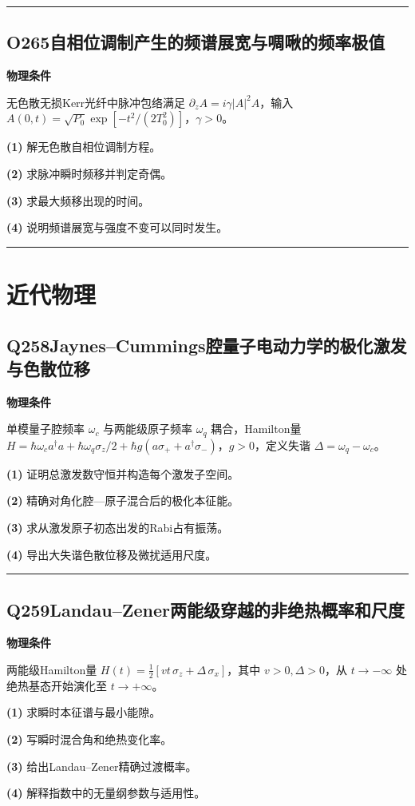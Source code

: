 \documentclass[UTF8,a4paper,11pt,oneside,openany]{ctexbook}
\begin{document}
\par\bigskip\hrule\bigskip
\section*{O265\quad 自相位调制产生的频谱展宽与啁啾的频率极值}
\textbf{物理条件}\par 无色散无损Kerr光纤中脉冲包络满足 \(\partial_zA=i\gamma|A|^2A\)，输入 \(A(0,t)=\sqrt{P_0}\exp[-t^2/(2T_0^2)]\)，\(\gamma>0\)。
\par\noindent\textbf{(1)} 解无色散自相位调制方程。
\par\noindent\textbf{(2)} 求脉冲瞬时频移并判定奇偶。
\par\noindent\textbf{(3)} 求最大频移出现的时间。
\par\noindent\textbf{(4)} 说明频谱展宽与强度不变可以同时发生。

\par\bigskip\hrule\bigskip
\chapter{近代物理}
\section*{Q258\quad Jaynes–Cummings腔量子电动力学的极化激发与色散位移}
\textbf{物理条件}\par 单模量子腔频率 \(\omega_c\) 与两能级原子频率 \(\omega_q\) 耦合，Hamilton量 \(H=\hbar\omega_c a^\dagger a+\hbar\omega_q\sigma_z/2+\hbar g(a\sigma_++a^\dagger\sigma_-)\)，\(g>0\)，定义失谐 \(\Delta=\omega_q-\omega_c\)。
\par\noindent\textbf{(1)} 证明总激发数守恒并构造每个激发子空间。
\par\noindent\textbf{(2)} 精确对角化腔—原子混合后的极化本征能。
\par\noindent\textbf{(3)} 求从激发原子初态出发的Rabi占有振荡。
\par\noindent\textbf{(4)} 导出大失谐色散位移及微扰适用尺度。

\par\bigskip\hrule\bigskip
\section*{Q259\quad Landau–Zener两能级穿越的非绝热概率和尺度}
\textbf{物理条件}\par 两能级Hamilton量 \(H(t)=\tfrac12[vt\,\sigma_z+\Delta\,\sigma_x]\)，其中 \(v>0,\Delta>0\)，从 \(t\to-\infty\) 处绝热基态开始演化至 \(t\to+\infty\)。
\par\noindent\textbf{(1)} 求瞬时本征谱与最小能隙。
\par\noindent\textbf{(2)} 写瞬时混合角和绝热变化率。
\par\noindent\textbf{(3)} 给出Landau–Zener精确过渡概率。
\par\noindent\textbf{(4)} 解释指数中的无量纲参数与适用性。
\end{document}
